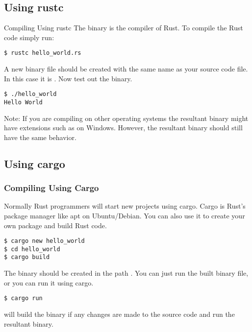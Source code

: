 \documentclass{beamer}
\begin{document}
\subsection{Using rustc}
\begin{frame}[fragile]{Compiling Using rustc}
  The  binary is the compiler of Rust. To compile the Rust code simply run:

\begin{lstlisting}
$ rustc hello_world.rs
\end{lstlisting}

  A new binary file should be created with the same name as your source code file. In this case it is . Now test out the binary.

\begin{lstlisting}
$ ./hello_world
Hello World
\end{lstlisting}

  \alert{Note:} If you are compiling on other operating systems the resultant binary might have extensions such as  on Windows. However, the resultant binary should still have the same behavior.
\end{frame}

\subsection{Using cargo}
\begin{frame}[fragile]
  \frametitle{Compiling Using Cargo}
  Normally Rust programmers will start new projects using cargo. Cargo is Rust's package manager like apt on Ubuntu/Debian. You can also use it to create your own package and build Rust code.
\begin{lstlisting}
$ cargo new hello_world
$ cd hello_world
$ cargo build
\end{lstlisting}

  The binary should be created in the path . You can just run the built binary file, or you can run it using cargo.

\begin{lstlisting}
$ cargo run
\end{lstlisting}

   will build the binary if any changes are made to the source code and run the resultant binary.
\end{frame}
\end{document}
